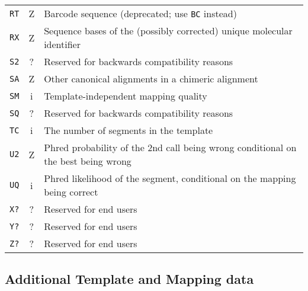 \documentclass[10pt]{article}
\begin{document}
\begin{center}
\begin{longtable}{ccp{12.5cm}}
  {\tt RT} & Z & Barcode sequence (deprecated; use {\tt BC} instead) \\
  {\tt RX} & Z & Sequence bases of the (possibly corrected) unique molecular identifier \\
  {\tt S2} & ? & Reserved for backwards compatibility reasons \\
  {\tt SA} & Z & Other canonical alignments in a chimeric alignment \\
  {\tt SM} & i & Template-independent mapping quality \\
  {\tt SQ} & ? & Reserved for backwards compatibility reasons \\
  {\tt TC} & i & The number of segments in the template \\
  {\tt U2} & Z & Phred probability of the 2nd call being wrong conditional on the best being wrong \\
  {\tt UQ} & i & Phred likelihood of the segment, conditional on the mapping being correct \\
  {\tt X?} & ? & Reserved for end users \\
  {\tt Y?} & ? & Reserved for end users \\
  {\tt Z?} & ? & Reserved for end users \\
  \hline
\end{longtable}
\end{center}

\subsection{Additional Template and Mapping data}
\end{document}
